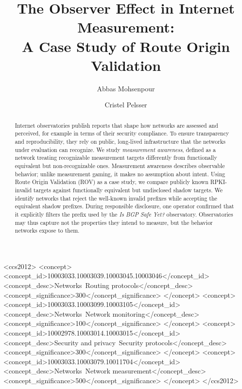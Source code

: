 \documentclass[sigconf, 10pt]{acmart}
\title[The Observer Effect in Internet Measurement]{The Observer Effect in Internet Measurement:\\A Case Study of Route Origin Validation}
\author{Abbas Mohsenpour}
\affiliation{%
  \institution{UCLouvain}
  \city{Louvain-la-Neuve}
  \country{Belgium}
}
\author{Cristel Pelsser}
\affiliation{%
  \institution{UCLouvain}
  \city{Louvain-la-Neuve}
  \country{Belgium}
}
\begin{document}

\begin{CCSXML}
<ccs2012>
<concept>
<concept_id>10003033.10003039.10003045.10003046</concept_id>
<concept_desc>Networks~Routing protocols</concept_desc>
<concept_significance>300</concept_significance>
</concept>
<concept>
<concept_id>10003033.10003099.10003105</concept_id>
<concept_desc>Networks~Network monitoring</concept_desc>
<concept_significance>100</concept_significance>
</concept>
<concept>
<concept_id>10002978.10003014.10003015</concept_id>
<concept_desc>Security and privacy~Security protocols</concept_desc>
<concept_significance>300</concept_significance>
</concept>
<concept>
<concept_id>10003033.10003079.10011704</concept_id>
<concept_desc>Networks~Network measurement</concept_desc>
<concept_significance>500</concept_significance>
</concept>
</ccs2012>
\end{CCSXML}





\begin{abstract}
Internet observatories publish reports that shape how networks are assessed and perceived, for example in terms of their security compliance. To ensure transparency and reproducibility, they rely on public, long-lived infrastructure that the networks under evaluation can recognize. We study \emph{measurement awareness}, defined as a network treating recognizable measurement targets differently from functionally equivalent but non-recognizable ones. Measurement awareness describes observable behavior; unlike measurement gaming, it makes no assumption about intent. Using Route Origin Validation (ROV) as a case study, we compare publicly known RPKI-invalid targets against functionally equivalent but undisclosed shadow targets. We identify networks that reject the well-known invalid prefixes while accepting the equivalent shadow prefixes. During responsible disclosure, one operator confirmed that it explicitly filters the prefix used by the \emph{Is BGP Safe Yet?} observatory. Observatories may thus capture not the properties they intend to measure, but the behavior networks expose to them.
\end{abstract}
\end{document}
